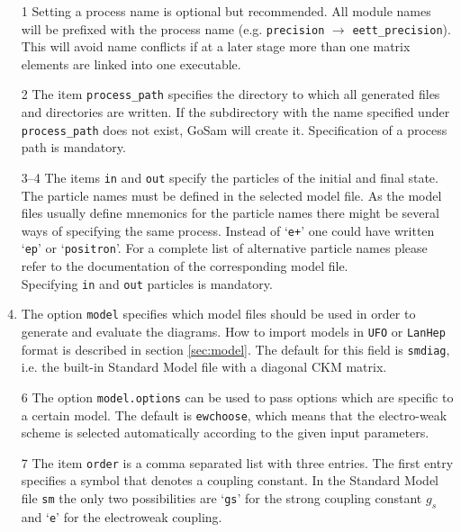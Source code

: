 \documentclass[11pt,a4paper]{refrep}
\newcommand{\gosam}{{\sc GoSam}\xspace}
\begin{document}
\begin{enumerate}
\item[1] Setting a process name is optional but recommended. All module
names will be prefixed with the  process name (e.g. \texttt{precision}
$\to$ \texttt{eett\_precision}). This will avoid name conflicts if at
a later stage more than one matrix elements are linked into one
executable.
\item[2] The item \texttt{process\_path} specifies the directory
to which all generated files and directories are written.
If the subdirectory with the name specified under \texttt{process\_path}
does not exist, \gosam{} will create it.
Specification of a process path is mandatory. 
\item[3--4] The items \texttt{in} and \texttt{out} specify the particles
of the initial and final state. The particle names must be defined in the
selected model file. As the model files usually define mnemonics for the
particle names there might be several ways of specifying the same process.
Instead of `\lstinline[basicstyle=\ttfamily]{e+}'
one could have written `\lstinline[basicstyle=\ttfamily]{ep}'
or `\lstinline[basicstyle=\ttfamily]{positron}'.
For a complete list of
alternative particle names please refer to the documentation of the
corresponding model file.
\\Specifying \texttt{in} and \texttt{out} particles is mandatory.
\item[5] The option \texttt{model} specifies which model files should
be used in order to generate and evaluate the diagrams. 
How to import models in {\tt UFO} or {\tt LanHep} format is described in 
section \ref{sec:model}.
The default for this field is {\tt smdiag}, i.e. the built-in Standard Model file
with a diagonal CKM matrix.
\item[6] The option \texttt{model.options} can be used to pass options 
which are specific to a certain model. The default is {\tt ewchoose}, 
which means that the electro-weak scheme is selected automatically according to the 
given input parameters.
\item[7] The item \texttt{order} is a comma separated list with
three entries. The first entry specifies a symbol that denotes a coupling
constant. In the Standard Model file \texttt{sm} the only two possibilities
are `\lstinline[basicstyle=\ttfamily]{gs}' for the strong coupling constant
$g_s$ and `\lstinline[basicstyle=\ttfamily]{e}' for the electroweak coupling.

\end{enumerate}
\end{document}
